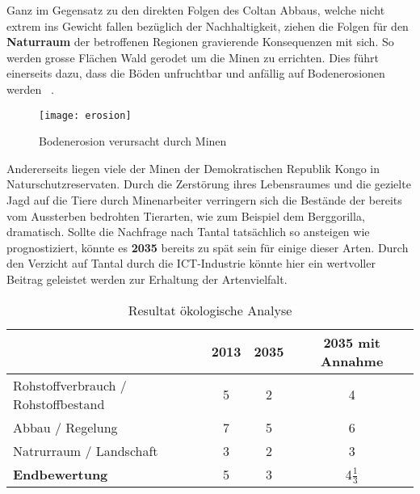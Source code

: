 Ganz im Gegensatz zu den direkten Folgen des Coltan Abbaus, welche nicht extrem
ins Gewicht fallen bezüglich der Nachhaltigkeit, ziehen die Folgen für den
\textbf{Naturraum} der betroffenen Regionen gravierende Konsequenzen mit sich.
So werden grosse Flächen Wald gerodet um die Minen zu errichten. Dies führt
einerseits dazu, dass die Böden unfruchtbar und anfällig auf Bodenerosionen
werden ~\cite{environmental_management}.

\begin{figure}[h]
\centering
\texttt{[image: erosion]}
\caption{Bodenerosion verursacht durch Minen ~\cite{Coltanmi34:online}}
\label{}
\end{figure}
\pagebreak

Andererseits liegen viele der Minen der Demokratischen Republik Kongo in
Naturschutzreservaten. Durch die Zerstörung ihres Lebensraumes und die gezielte
Jagd auf die Tiere durch Minenarbeiter verringern sich die Bestände der bereits
vom Aussterben bedrohten Tierarten, wie zum Beispiel dem Berggorilla, dramatisch.
Sollte die Nachfrage nach Tantal tatsächlich so ansteigen wie prognostiziert,
könnte es \textbf{2035} bereits zu spät sein für einige dieser Arten.
Durch den Verzicht auf Tantal durch die ICT-Industrie könnte hier ein wertvoller
Beitrag geleistet werden zur Erhaltung der Artenvielfalt.

\begin{table}[h]
  \centering
  \begin{tabular}{l|ccc}                                    & \textbf{2013} & \textbf{2035} & \textbf{2035 mit Annahme}
    \\ \hline Rohstoffverbrauch / Rohstoffbestand                 & 5             & 2             & 4 
    \\ Abbau / Regelung                                           & 7             & 5             & 6
    \\ Natrurraum / Landschaft                                    & 3             & 2             & 3
    \\ \hline \textbf{Endbewertung}                               & 5             & 3             & 4\(\frac{1}{3}\)
  \end{tabular}
  \caption{Resultat ökologische Analyse}
\end{table}
